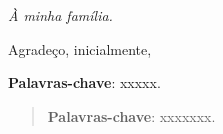 \cleardoublepage
\thispagestyle{empty}
\vspace*{200mm}

\begin{flushright}
{\em 
À minha família.
}
\end{flushright}
\newpage


\hspace{5mm}
Agradeço, inicialmente, 

\begin{resumo}



{\hspace{-8mm} \bf{Palavras-chave}}: xxxxx.

\acresetall

\end{resumo}

\begin{abstract}


{\hspace{-8mm} \bf{Palavras-chave}}: xxxxxxx.


\acresetall

\end{abstract}

\cleardoublepage
\listoffigures
\label{listadefiguras}
\acresetall

\cleardoublepage
\label{listadetabelas}
\listoftables
\cleardoublepage
\acresetall


